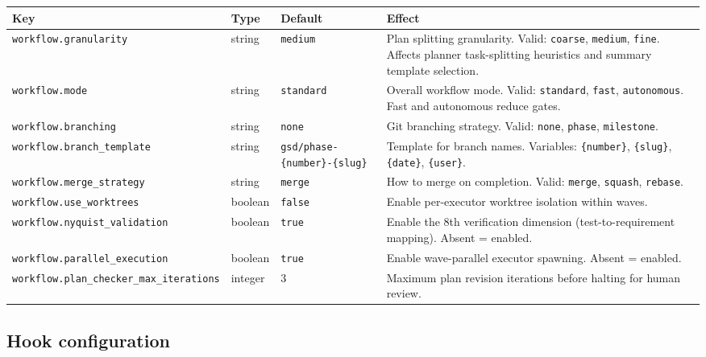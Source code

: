 \documentclass[11pt,letterpaper,openany]{book}
\begin{document}
\begin{center}
\footnotesize
\begin{longtable}{lll p{5.8cm}}
\toprule
Key & Type & Default & Effect \\
\midrule
\endhead
\texttt{workflow.granularity} & string & \texttt{medium} & Plan splitting granularity. Valid: \texttt{coarse}, \texttt{medium}, \texttt{fine}. Affects planner task-splitting heuristics and summary template selection. \\
\texttt{workflow.mode} & string & \texttt{standard} & Overall workflow mode. Valid: \texttt{standard}, \texttt{fast}, \texttt{autonomous}. Fast and autonomous reduce gates. \\
\texttt{workflow.branching} & string & \texttt{none} & Git branching strategy. Valid: \texttt{none}, \texttt{phase}, \texttt{milestone}. \\
\texttt{workflow.branch\_template} & string & \texttt{gsd/phase-\{number\}-\{slug\}} & Template for branch names. Variables: \texttt{\{number\}}, \texttt{\{slug\}}, \texttt{\{date\}}, \texttt{\{user\}}. \\
\texttt{workflow.merge\_strategy} & string & \texttt{merge} & How to merge on completion. Valid: \texttt{merge}, \texttt{squash}, \texttt{rebase}. \\
\texttt{workflow.use\_worktrees} & boolean & \texttt{false} & Enable per-executor worktree isolation within waves. \\
\texttt{workflow.nyquist\_validation} & boolean & \texttt{true} & Enable the 8th verification dimension (test-to-requirement mapping). Absent = enabled. \\
\texttt{workflow.parallel\_execution} & boolean & \texttt{true} & Enable wave-parallel executor spawning. Absent = enabled. \\
\texttt{workflow.plan\_checker\_max\_iterations} & integer & 3 & Maximum plan revision iterations before halting for human review. \\
\bottomrule
\end{longtable}
\end{center}

\subsection*{Hook configuration}
\end{document}

